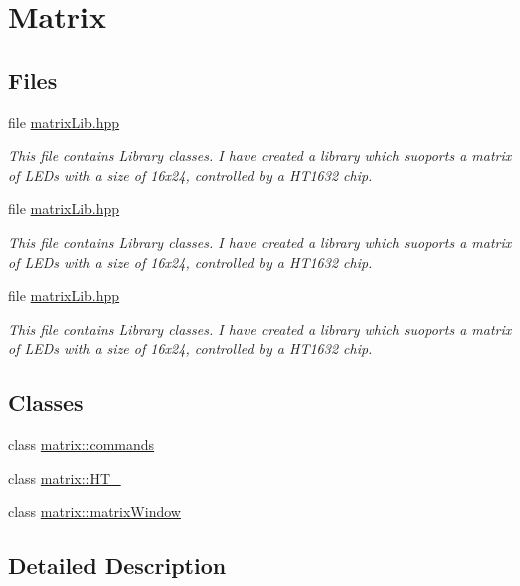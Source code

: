 \hypertarget{group__matrix}{}\section{Matrix}
\label{group__matrix}
\subsection*{Files}
\begin{DoxyCompactItemize}
\item 
file \hyperlink{matrix_lib_8hpp}{matrix\+Lib.\+hpp}
\begin{DoxyCompactList}\small\item\em This file contains Library classes. I have created a library which suoports a matrix of L\+E\+Ds with a size of 16x24, controlled by a H\+T1632 chip. \end{DoxyCompactList}\item 
file \hyperlink{matrix_lib_8hpp}{matrix\+Lib.\+hpp}
\begin{DoxyCompactList}\small\item\em This file contains Library classes. I have created a library which suoports a matrix of L\+E\+Ds with a size of 16x24, controlled by a H\+T1632 chip. \end{DoxyCompactList}\item 
file \hyperlink{matrix_lib_8hpp}{matrix\+Lib.\+hpp}
\begin{DoxyCompactList}\small\item\em This file contains Library classes. I have created a library which suoports a matrix of L\+E\+Ds with a size of 16x24, controlled by a H\+T1632 chip. \end{DoxyCompactList}\end{DoxyCompactItemize}
\subsection*{Classes}
\begin{DoxyCompactItemize}
\item 
class \hyperlink{structmatrix_1_1commands}{matrix\+::commands}
\item 
class \hyperlink{classmatrix_1_1_h_t__1632}{matrix\+::\+H\+T\+\_}
\item 
class \hyperlink{classmatrix_1_1matrix_window}{matrix\+::matrix\+Window}
\end{DoxyCompactItemize}


\subsection{Detailed Description}
